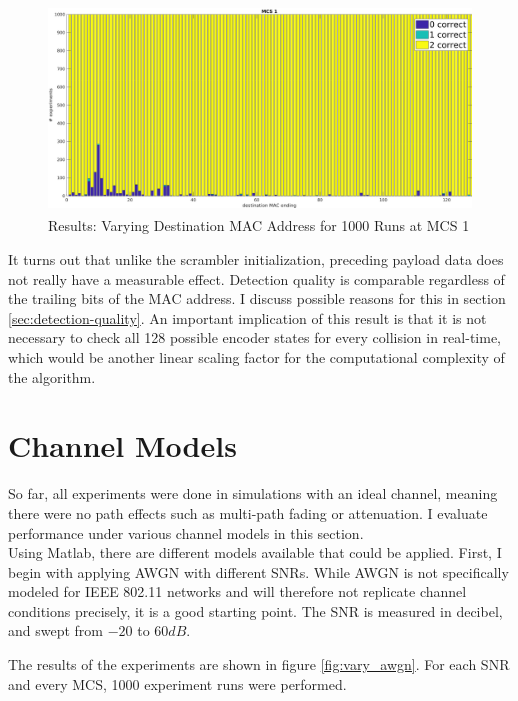 \begin{figure}[H]
	\centering
	\includegraphics[height=5.5cm]{gfx/plots/destination}
	\caption[Results: Varying Destination \gls{MAC} Address for 1000 Runs]{Results: Varying Destination \gls{MAC} Address for 1000 Runs at MCS 1}
	\label{fig:vary_dest}
\end{figure}

It turns out that unlike the scrambler initialization, preceding payload data does not really have a measurable effect. Detection quality is comparable regardless of the trailing bits of the \gls{MAC} address. I discuss possible reasons for this in section \ref{sec:detection-quality}. An important implication of this result is that it is not necessary to check all 128 possible encoder states for every collision in real-time, which would be another linear scaling factor for the computational complexity of the algorithm.



\section{Channel Models}

So far, all experiments were done in simulations with an ideal channel, meaning there were no path effects such as multi-path fading or attenuation. I evaluate performance under various channel models in this section.\\

Using Matlab, there are different models available that could be applied. First, I begin with applying \gls{AWGN} with different \glspl{SNR}. While \gls{AWGN} is not specifically modeled for IEEE 802.11 networks and will therefore not replicate channel conditions precisely, it is a good starting point. The \gls{SNR} is measured in decibel, and swept from $ -20 $ to $ 60 dB $.

The results of the experiments are shown in figure \ref{fig:vary_awgn}. For each \gls{SNR} and every \gls{MCS}, 1000 experiment runs were performed.\\


